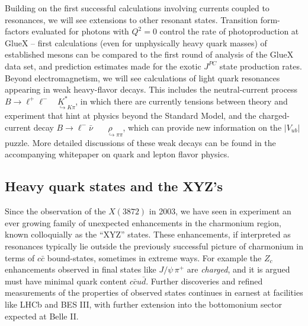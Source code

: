Building on the first successful calculations involving currents coupled to resonances, we will see extensions to other resonant states. Transition form-factors evaluated for photons with $Q^2=0$ control the rate of photoproduction at GlueX -- first calculations (even for unphysically heavy quark masses) of established mesons can be compared to the first round of analysis of the GlueX data set, and prediction estimates made for the exotic $J^{PC}$ state production rates. Beyond electromagnetism, we will see calculations of light quark resonances appearing in weak heavy-flavor decays. This includes the neutral-current process $B \to \ell^+\ell^- \!\!\!\! \underset{\;\;\;\;\;\hookrightarrow K\pi}{K^*}$, in which there are currently tensions between theory and experiment that hint at physics beyond the Standard Model, and the charged-current decay $B \to \ell^-\bar{\nu}  \!\!\!\!\!\!\!\!\;\;\underset{\;\;\;\;\;\;\hookrightarrow \pi\pi}{\rho}$, which can provide new information on the $|V_{ub}|$ puzzle. More detailed discussions of these weak decays can be found in
the accompanying whitepaper on quark and lepton flavor physics.













\subsection{Heavy quark states and the XYZ's}

Since the observation of the $X(3872)$ in 2003, we have seen in experiment an ever growing family of unexpected enhancements in the charmonium region, known colloquially as the ``XYZ'' states. These enhancements, if interpreted as resonances typically lie outside the previously successful picture of charmonium in terms of $c\bar{c}$ bound-states, sometimes in extreme ways. For example the $Z_c$ enhancements observed in final states like $J/\psi \, \pi^+$ are \emph{charged}, and it is argued must have minimal quark content $c\bar{c} u \bar{d}$. Further discoveries and refined measurements of the properties of observed states continues in earnest at facilities like LHCb and BES III, with further extension into the bottomonium sector expected at Belle II.

